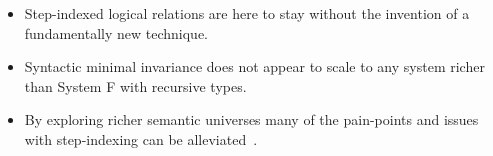 \documentclass[a0,landscape]{a0poster}
\begin{document}
\begin{multicols}{4}
  \begin{itemize}
  \item Step-indexed logical relations are here to stay without the
    invention of a fundamentally new technique.
  \item Syntactic minimal invariance does not appear to scale to any
    system richer than System F with recursive types.
  \item By exploring richer semantic universes many of the pain-points
    and issues with step-indexing can be
    alleviated~\citep{Svendsen:16}.
  \end{itemize}

  \color{DarkSlateGray}
  \tiny
  
  {}
\end{multicols}
\end{document}
